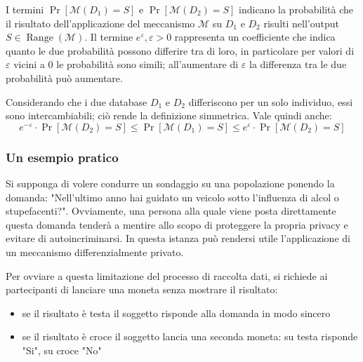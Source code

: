 I termini $\Pr[\mathcal{M}(D_1) = S]$ e $\Pr[\mathcal{M}(D_2) = S]$ indicano la probabilità che il risultato dell'applicazione del meccanismo $\mathcal{M}$ su $D_1$ e $D_2$ risulti nell'output $S \in \operatorname{Range}(\mathcal{M})$.
Il termine $e^\varepsilon, \varepsilon > 0$ rappresenta un coefficiente che indica quanto le due probabilità possono differire tra di loro, in particolare per valori di $\varepsilon$ vicini a $0$ le probabilità sono simili; all'aumentare di $\varepsilon$ la differenza tra le due probabilità può aumentare.

Considerando che i due database $D_1$ e $D_2$ differiscono per un solo individuo, essi sono intercambiabili; ciò rende la definizione simmetrica. Vale quindi anche:
\begin{equation}
  e^{-\varepsilon} \cdot \Pr[\mathcal{M}(D_2) = S] \le \Pr[\mathcal{M}(D_1) = S] \le e^{\varepsilon} \cdot \Pr[\mathcal{M}(D_2) = S]
  \label{eq:e_differential_privacy_symm}
\end{equation}

\subsubsection{Un esempio pratico}
\label{ex:coint_toss}
Si supponga di volere condurre un sondaggio su una popolazione ponendo la domanda: "Nell'ultimo anno hai guidato un veicolo sotto l'influenza di alcol o stupefacenti?".
Ovviamente, una persona alla quale viene posta direttamente questa domanda tenderà a mentire allo scopo di proteggere la propria privacy e evitare di autoincriminarsi. In questa istanza può rendersi utile l'applicazione di un meccanismo differenzialmente privato.

Per ovviare a questa limitazione del processo di raccolta dati, si richiede ai partecipanti di lanciare una moneta senza mostrare il risultato:
\begin{itemize}
    \item se il risultato è testa il soggetto risponde alla domanda in modo sincero
    \item se il risultato è croce il soggetto lancia una seconda moneta: su testa risponde "Si", su croce "No"
\end{itemize}

